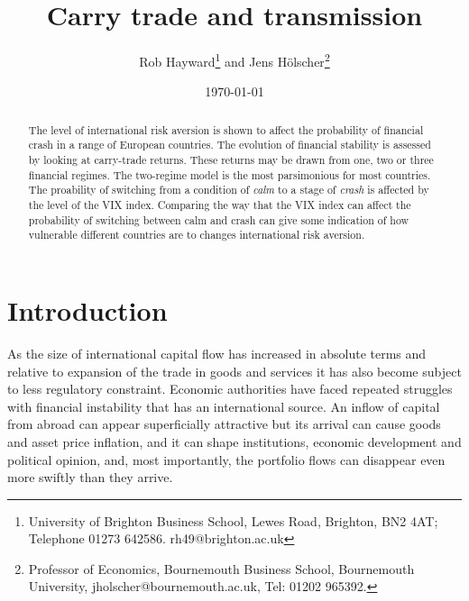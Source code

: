 \documentclass[12pt, a4paper, oneside]{article} %
\begin{document}
\title{Carry trade and transmission}
\author{Rob Hayward\footnote{University of Brighton Business School, Lewes Road, Brighton, BN2 4AT; Telephone 01273 642586.  rh49@brighton.ac.uk} and  Jens H\"{o}lscher\footnote{Professor of Economics, Bournemouth Business School, Bournemouth University, jholscher@bournemouth.ac.uk, Tel: 01202 965392.}} 
\date{\today}
\maketitle
\begin{abstract}
The level of international risk aversion is shown to affect the probability of financial crash in a range of European countries.  The evolution of financial stability is assessed by looking at carry-trade  returns.  These returns may be drawn from one, two or three financial regimes.  The two-regime model is the most parsimonious for most countries.  The proability of switching from a condition of \emph{calm} to a stage of \emph{crash} is affected by the level of the VIX index.   Comparing the way that the VIX index can affect the probability of switching between calm and crash can give some indication of how vulnerable different countries are to changes international risk aversion.  
\end{abstract}

\section{Introduction}
As the size of international capital flow has increased in absolute terms and relative to expansion of the trade in goods and services it has also become subject to less regulatory constraint. Economic authorities have faced repeated struggles with financial instability that has an international source.  An inflow of capital from abroad can appear superficially attractive but its arrival can cause goods and asset price inflation, and it can shape institutions, economic development and political opinion, and, most importantly, the portfolio flows can disappear even more swiftly than they arrive.  %
\end{document}
